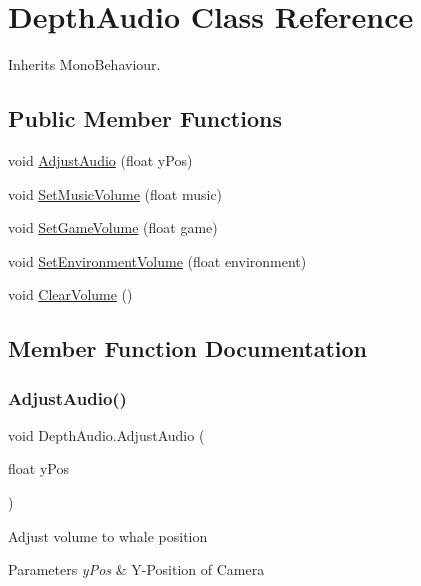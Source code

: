 \hypertarget{class_depth_audio}{}\section{Depth\+Audio Class Reference}
\label{class_depth_audio}


Inherits Mono\+Behaviour.

\subsection*{Public Member Functions}
\begin{DoxyCompactItemize}
\item 
void \hyperlink{class_depth_audio_acaaa1511d3e28cdcfd737dcee0ef133f}{Adjust\+Audio} (float y\+Pos)
\item 
void \hyperlink{class_depth_audio_a78b5f1a8e922b5e56fff1846b739822f}{Set\+Music\+Volume} (float music)
\item 
void \hyperlink{class_depth_audio_a641bf7c342dbbd04aca32b68fb526b23}{Set\+Game\+Volume} (float game)
\item 
void \hyperlink{class_depth_audio_a48a2f99259fd6c1e7a02e9b336bf0ce5}{Set\+Environment\+Volume} (float environment)
\item 
void \hyperlink{class_depth_audio_a8609f22cfa403faa76be601fcfacad05}{Clear\+Volume} ()
\end{DoxyCompactItemize}


\subsection{Member Function Documentation}
\mbox{\label{class_depth_audio_acaaa1511d3e28cdcfd737dcee0ef133f}} 
\subsubsection{\texorpdfstring{Adjust\+Audio()}{AdjustAudio()}}
{\footnotesize\ttfamily void Depth\+Audio.\+Adjust\+Audio (\begin{DoxyParamCaption}\item[{float}]{y\+Pos }\end{DoxyParamCaption})}



Adjust volume to whale position 
\begin{DoxyParams}{Parameters}
{\em y\+Pos} & Y-\/\+Position of Camera\\
\hline
\end{DoxyParams}


